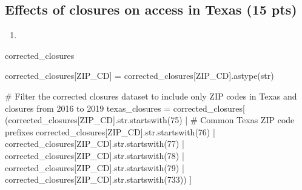 \documentclass[
  letterpaper,
  DIV=11,
  numbers=noendperiod]{scrartcl}
\newenvironment{Shaded}{\begin{snugshade}}{\end{snugshade}}
\newcommand{\BuiltInTok}[1]{\textcolor[rgb]{0.00,0.23,0.31}{#1}}
\newcommand{\CommentTok}[1]{\textcolor[rgb]{0.37,0.37,0.37}{#1}}
\newcommand{\NormalTok}[1]{\textcolor[rgb]{0.00,0.23,0.31}{#1}}
\newcommand{\OperatorTok}[1]{\textcolor[rgb]{0.37,0.37,0.37}{#1}}
\newcommand{\StringTok}[1]{\textcolor[rgb]{0.13,0.47,0.30}{#1}}
\providecommand{\tightlist}{%
  \setlength{\itemsep}{0pt}\setlength{\parskip}{0pt}}\usepackage{longtable,booktabs,array}
\begin{document}
\subsection{Effects of closures on access in Texas (15
pts)}\label{effects-of-closures-on-access-in-texas-15-pts}

\begin{enumerate}
\def\labelenumi{\arabic{enumi}.}
\tightlist
\item
\end{enumerate}

\begin{Shaded}
\begin{Highlighting}[]
\NormalTok{corrected\_closures}

\NormalTok{corrected\_closures[}\StringTok{\textquotesingle{}ZIP\_CD\textquotesingle{}}\NormalTok{] }\OperatorTok{=}\NormalTok{ corrected\_closures[}\StringTok{\textquotesingle{}ZIP\_CD\textquotesingle{}}\NormalTok{].astype(}\BuiltInTok{str}\NormalTok{)}

\CommentTok{\# Filter the corrected closures dataset to include only ZIP codes in Texas and closures from 2016 to 2019}
\NormalTok{texas\_closures }\OperatorTok{=}\NormalTok{ corrected\_closures[}
\NormalTok{    (corrected\_closures[}\StringTok{\textquotesingle{}ZIP\_CD\textquotesingle{}}\NormalTok{].}\BuiltInTok{str}\NormalTok{.startswith(}\StringTok{\textquotesingle{}75\textquotesingle{}}\NormalTok{) }\OperatorTok{|}  \CommentTok{\# Common Texas ZIP code prefixes}
\NormalTok{     corrected\_closures[}\StringTok{\textquotesingle{}ZIP\_CD\textquotesingle{}}\NormalTok{].}\BuiltInTok{str}\NormalTok{.startswith(}\StringTok{\textquotesingle{}76\textquotesingle{}}\NormalTok{) }\OperatorTok{|}
\NormalTok{     corrected\_closures[}\StringTok{\textquotesingle{}ZIP\_CD\textquotesingle{}}\NormalTok{].}\BuiltInTok{str}\NormalTok{.startswith(}\StringTok{\textquotesingle{}77\textquotesingle{}}\NormalTok{) }\OperatorTok{|}
\NormalTok{     corrected\_closures[}\StringTok{\textquotesingle{}ZIP\_CD\textquotesingle{}}\NormalTok{].}\BuiltInTok{str}\NormalTok{.startswith(}\StringTok{\textquotesingle{}78\textquotesingle{}}\NormalTok{) }\OperatorTok{|}
\NormalTok{     corrected\_closures[}\StringTok{\textquotesingle{}ZIP\_CD\textquotesingle{}}\NormalTok{].}\BuiltInTok{str}\NormalTok{.startswith(}\StringTok{\textquotesingle{}79\textquotesingle{}}\NormalTok{) }\OperatorTok{|}
\NormalTok{     corrected\_closures[}\StringTok{\textquotesingle{}ZIP\_CD\textquotesingle{}}\NormalTok{].}\BuiltInTok{str}\NormalTok{.startswith(}\StringTok{\textquotesingle{}733\textquotesingle{}}\NormalTok{))}
\NormalTok{]}


\end{Highlighting}
\end{Shaded}
\end{document}
